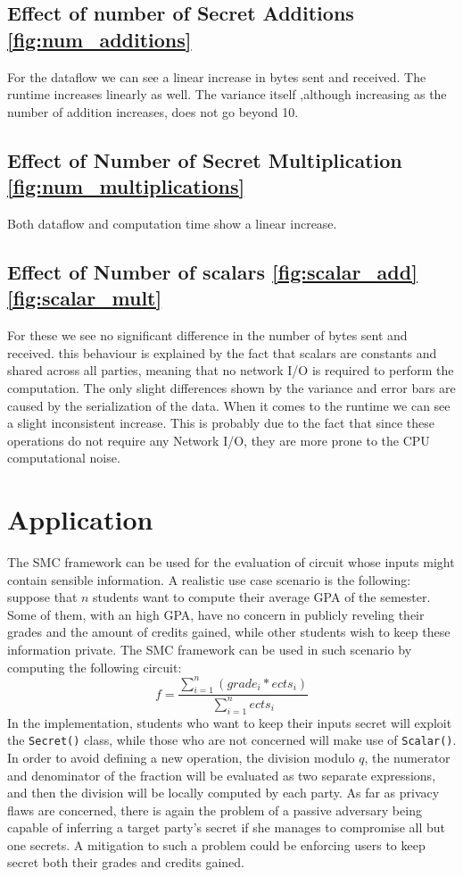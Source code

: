 \documentclass[10pt,conference,compsocconf]{IEEEtran}
\begin{document}
\subsection{Effect of number of Secret Additions \ref{fig:num_additions}}

For the dataflow we can see a linear increase in bytes sent and received.
The runtime increases linearly as well.
The variance itself ,although increasing as the number of addition increases, does not go beyond 10.

\subsection{Effect of Number of Secret Multiplication \ref{fig:num_multiplications}}
Both dataflow and computation time show a linear increase.

\subsection{Effect of Number of scalars \ref{fig:scalar_add}\ref{fig:scalar_mult}}
For these we see no significant difference in the number of bytes sent and received.
this behaviour is explained by the fact that scalars are constants and shared across all parties, meaning that no network
I/O is required to perform the computation.
The only slight differences shown by the variance and error bars are caused by the serialization of the data.
When it comes to the runtime we can see a slight inconsistent increase.
This is probably due to the fact that since these operations do not require any Network I/O, they are more
prone to the CPU computational noise.

\section{Application}
The SMC framework can be used for the evaluation of circuit whose inputs might contain sensible information.
A realistic use case scenario is the following: suppose that $n$ students want to compute their average GPA of the semester.
Some of them, with an high GPA, have no concern in publicly reveling their grades and the amount of credits gained, while other students wish to keep these information private.
The SMC framework can be used in such scenario by computing the following circuit:
\[f = \frac{\sum_{i=1}^{n}(grade_{i}*ects_{i})}{\sum_{i=1}^{n}ects_{i}}\]
In the implementation, students who want to keep their inputs secret will exploit the \texttt{Secret()} class, while those who are not concerned will make use of \texttt{Scalar()}.
In order to avoid defining a new operation, the division modulo $q$, the numerator and denominator of the fraction will be evaluated as two separate expressions, and then the division will be locally computed by each party.
As far as privacy flaws are concerned, there is again the problem of a passive adversary being capable of inferring a target party's secret if she manages to compromise all but one secrets.
A mitigation to such a problem could be enforcing users to keep secret both their grades and credits gained.



\end{document}
